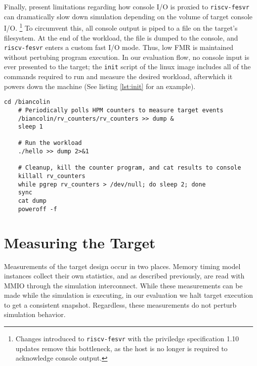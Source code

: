 Finally, present limitations regarding how console I/O is proxied to
\texttt{riscv-fesvr} can dramatically slow down simulation depending on the
volume of target console I/O. \footnote{Changes introduced to
\texttt{riscv-fesvr} with the priviledge specification 1.10 updates remove this
bottleneck, as the host is no longer is required to acknowledge console
output.} To circumvent this, all console output is piped to a file on the
target's filesystem. At the end of the workload, the file is dumped to the
console, and \texttt{riscv-fesvr} enters a custom fast I/O mode.  Thus, low FMR
is maintained without pertubing program execution. In our evaluation flow, no
console input is ever presented to the target; the \texttt{init} script of the
linux image includes all of the commands required to run and measure the
desired workload, afterwhich it powers down the machine (See listing
\ref{lst:init} for an example).\\


\lstset{style=init}

\begin{lstlisting}[caption={An example init script generated during the build process},label={lst:init}]
    cd /biancolin
    # Periodically polls HPM counters to measure target events
    /biancolin/rv_counters/rv_counters >> dump &
    sleep 1

    # Run the workload
    ./hello >> dump 2>&1

    # Cleanup, kill the counter program, and cat results to console
    killall rv_counters
    while pgrep rv_counters > /dev/null; do sleep 2; done
    sync
    cat dump
    poweroff -f
\end{lstlisting}

\section{Measuring the Target}

Measurements of the target design occur in two places.
Memory timing model instances collect their own statistics, and
as described previously, are read with MMIO through the simulation
interconnect. While these measurements can be made while the simulation is
executing, in our evaluation we halt target execution to get a consistent
snapshot. Regardless, these measurements do not perturb simulation behavior.

